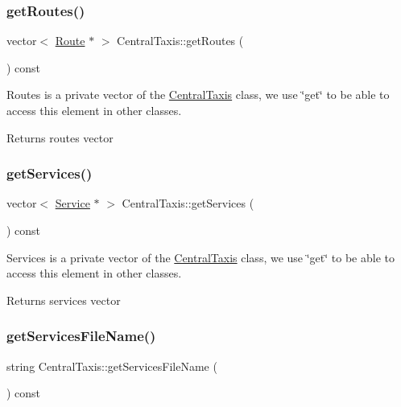 \subsubsection{\texorpdfstring{get\+Routes()}{getRoutes()}}
{\footnotesize\ttfamily vector$<$ \hyperlink{classRoute}{Route} $\ast$ $>$ Central\+Taxis\+::get\+Routes (\begin{DoxyParamCaption}{ }\end{DoxyParamCaption}) const}

Routes is a private vector of the \hyperlink{classCentralTaxis}{Central\+Taxis} class, we use \char`\"{}get\char`\"{} to be able to access this element in other classes. \begin{DoxyReturn}{Returns}
routes vector 
\end{DoxyReturn}
\hypertarget{classCentralTaxis_af1d3832f3a1c96b78d04b4970cd8f777}{}\label{classCentralTaxis_af1d3832f3a1c96b78d04b4970cd8f777} 
\subsubsection{\texorpdfstring{get\+Services()}{getServices()}}
{\footnotesize\ttfamily vector$<$ \hyperlink{classService}{Service} $\ast$ $>$ Central\+Taxis\+::get\+Services (\begin{DoxyParamCaption}{ }\end{DoxyParamCaption}) const}

Services is a private vector of the \hyperlink{classCentralTaxis}{Central\+Taxis} class, we use \char`\"{}get\char`\"{} to be able to access this element in other classes. \begin{DoxyReturn}{Returns}
services vector 
\end{DoxyReturn}
\hypertarget{classCentralTaxis_a28391cdefa6db5676197fbea2c031160}{}\label{classCentralTaxis_a28391cdefa6db5676197fbea2c031160} 
\subsubsection{\texorpdfstring{get\+Services\+File\+Name()}{getServicesFileName()}}
{\footnotesize\ttfamily string Central\+Taxis\+::get\+Services\+File\+Name (\begin{DoxyParamCaption}{ }\end{DoxyParamCaption}) const}

